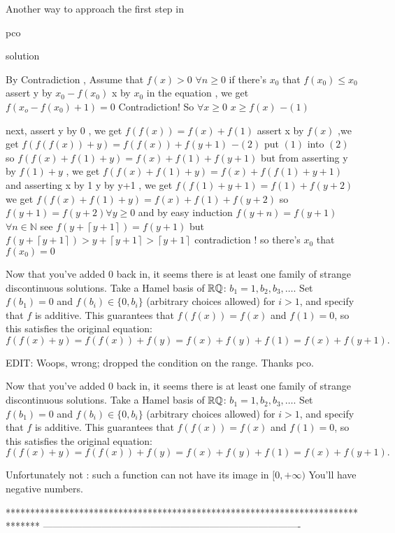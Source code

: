 \begin{solution}
	Another way to approach the first step in \begin{bolded}pco\end{bolded} solution 

By Contradiction , Assume that $f(x) > 0$  $\forall n \geq 0 $ 
if there's $x_0$ that $f(x_0) \leq x_0 $ assert y by $x_0-f(x_0)$ x by $x_0$ in the equation , we get $f(x_o-f(x_0)+1) = 0$ Contradiction!
So $\forall x\geq 0 $ $x \geq f(x)$ $-(1)$

next, assert y by 0 , we get $f(f(x))=f(x)+f(1)$
assert x by $f(x)$ ,we get  $f(f(f(x))+y)=f(f(x))+f(y+1)$ $-(2)$
put $(1)$ into $(2)$ so $f(f(x)+f(1)+y)=f(x)+f(1)+f(y+1)$
but from asserting y by $f(1)+y$ , we get $f(f(x)+f(1)+y)=f(x)+f(f(1)+y+1)$
      and asserting x by 1 y by y+1 , we get $f(f(1)+y+1)=f(1)+f(y+2)$ 
we get $f(f(x)+f(1)+y)=f(x)+f(1)+f(y+2)$
so $f(y+1)=f(y+2) \forall y \geq 0$ and by easy induction $f(y+n)=f(y+1)$ $\forall n \in \mathbb{N}$ 
see $f(y+\left\lceil y+1\right\rceil) = f(y+1)$ but $f(y+\left\lceil y+1\right\rceil)>y+\left\lceil y+1\right\rceil>\left\lceil y+1\right\rceil$ contradiction ! 
so there's $x_0$ that $f(x_0)=0$
\end{solution}



\begin{solution}
	Now that you've added 0 back in, it seems there is at least one family of strange discontinuous solutions. Take a Hamel basis of $\mathbb{R}\/\mathbb{Q}$: $b_1 = 1, b_2, b_3, \ldots$. Set $f(b_1) = 0$ and $f(b_i) \in \{0, b_i\}$ (arbitrary choices allowed) for $i > 1$, and specify that $f$ is additive. This guarantees that $f(f(x)) = f(x)$ and $f(1) = 0$, so this satisfies the original equation:
\[f(f(x) + y) = f(f(x)) + f(y) = f(x) + f(y) + f(1) = f(x) + f(y+1).\]

EDIT: Woops, wrong; dropped the condition on the range. Thanks pco.
\end{solution}



\begin{solution}
	\begin{tcolorbox}Now that you've added 0 back in, it seems there is at least one family of strange discontinuous solutions. Take a Hamel basis of $\mathbb{R}\/\mathbb{Q}$: $b_1 = 1, b_2, b_3, \ldots$. Set $f(b_1) = 0$ and $f(b_i) \in \{0, b_i\}$ (arbitrary choices allowed) for $i > 1$, and specify that $f$ is additive. This guarantees that $f(f(x)) = f(x)$ and $f(1) = 0$, so this satisfies the original equation:
\[f(f(x) + y) = f(f(x)) + f(y) = f(x) + f(y) + f(1) = f(x) + f(y+1).\]\end{tcolorbox}
Unfortunately not : such a function can not have its image in $[0,+\infty)$ You'll have negative numbers.
\end{solution}
*******************************************************************************
-------------------------------------------------------------------------------

